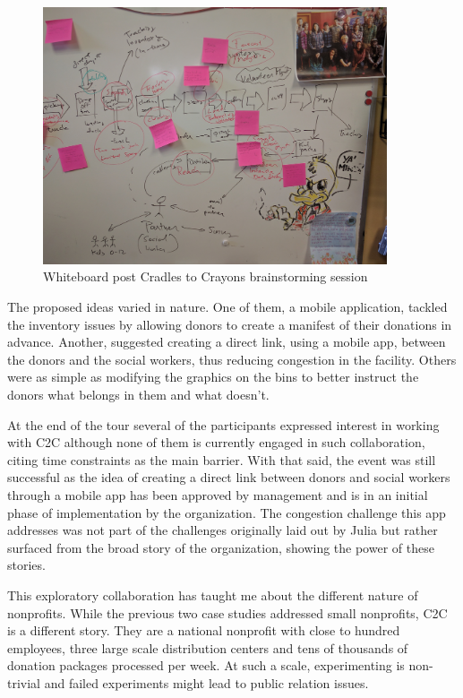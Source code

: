    \begin{figure}[thpb]
      \centering
      \includegraphics[width=4in]{figures/c2c-brainstorming.jpg}
      \caption{Whiteboard post Cradles to Crayons brainstorming session}
      \label{fig_setc_class}
   \end{figure}


The proposed ideas varied in nature. One of them, a mobile application, tackled the inventory issues by allowing donors to create a manifest of their donations in advance. Another, suggested creating a direct link, using a mobile app, between the donors and the social workers, thus reducing congestion in the facility. Others were as simple as modifying the graphics on the bins to better instruct the donors what belongs in them and what doesn't. 

At the end of the tour several of the participants expressed interest in working with C2C although none of them is currently engaged in such collaboration, citing time constraints as the main barrier. With that said, the event was still successful as the idea of creating a direct link between donors and social workers through a mobile app has been approved by management and is in an initial phase of implementation by the organization. The congestion challenge this app addresses was not part of the challenges originally laid out by Julia but rather surfaced from the broad story of the organization, showing the power of these stories.  

This exploratory collaboration has taught me about the different nature of nonprofits. While the previous two case studies addressed small nonprofits, C2C is a different story. They are a national nonprofit with close to hundred employees, three large scale distribution centers and tens of thousands of donation packages processed per week. At such a scale, experimenting is non-trivial and failed experiments might lead to public relation issues. 

